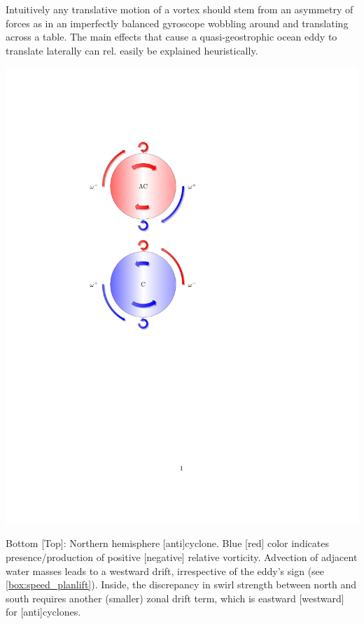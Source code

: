 Intuitively any translative motion of a vortex should stem from an asymmetry of forces as in an imperfectly balanced gyroscope wobbling around and translating across a table.
The main effects that cause a quasi-geostrophic ocean eddy to translate laterally can rel. easily be explained heuristically.

\begin{marginfigure}
\includegraphics[width=1\textwidth]{eddyTikz}
\caption{Bottom [Top]: Northern hemisphere [anti]cyclone. Blue [red] color indicates presence/production of positive [negative] relative vorticity. Advection of adjacent water masses leads to a westward drift, irrespective of the eddy's sign (see \cref{box:speed_planlift}). Inside, the discrepancy in swirl strength between north and south requires another (smaller) zonal drift term, which is eastward [westward] for [anti]cyclones. }
\label{fig:eddyTikz}
\end{marginfigure}


